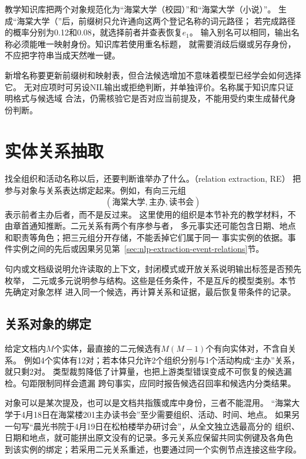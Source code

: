 教学知识库把两个对象规范化为“海棠大学（校园）”和“海棠大学（小说）”。
生成“海棠大学（”后，前缀树只允许通向这两个登记名称的词元路径；
若完成路径的概率分别为0.12和0.08，就选择前者并查表恢复$e_1$。
输入别名可以相同，输出名称必须能唯一映射身份。知识库若使用重名标题，
就需要消歧后缀或另存身份，不应把字符串当成天然唯一键。

新增名称要更新前缀树和映射表，但合法候选增加不意味着模型已经学会如何选择它。
无对应项时可另设NIL输出或拒绝判断，并单独评价。名称属于知识库只证明格式与候选域
合法，仍需核验它是否对应当前提及，不能用受约束生成替代身份判断。

\section{实体关系抽取}
\label{sec:nlp-extraction-relations}

找全组织和活动名称以后，还要判断谁举办了什么。（relation extraction, RE）
把参与对象与关系表达绑定起来。例如，有向三元组
\[
  (\text{海棠大学},\text{主办},\text{读书会})
\]
表示前者主办后者，而不是反过来。
这里使用的组织是本节补充的教学材料，不由章首通知推断。二元关系有两个有序参与者，
多元事实还可能包含日期、地点和职责等角色；把三元组分开存储，不能丢掉它们属于同一
事实实例的依据。事件实例之间的先后或因果另见第~\ref{sec:nlp-extraction-event-relations}节。

句内或文档级说明允许读取的上下文，封闭模式或开放关系说明输出标签是否预先枚举，
二元或多元说明参与结构。这些是任务条件，不是互斥的模型类别。本节先确定对象怎样
进入同一个候选，再计算关系和证据，最后恢复带条件的记录。

\subsection{关系对象的绑定}
\label{sec:nlp-extraction-relation-binding}

给定文档内$M$个实体，最直接的二元候选有$M(M-1)$个有向实体对，不含自关系。
例如4个实体有12对；若本体只允许2个组织分别与1个活动构成“主办”关系，就只剩2对。
类型裁剪降低了计算量，也把上游类型错误变成不可恢复的候选漏检。句距限制同样会遗漏
跨句事实，应同时报告候选召回率和候选内分类结果。

对象可以是某次提及，也可以是文档共指簇或库中身份，三者不能混用。
“海棠大学于4月18日在海棠楼201主办读书会”至少需要组织、活动、时间、地点。
如果另一句写“晨光书院于4月19日在松柏楼举办研讨会”，从全文独立选最高分的
组织、日期和地点，就可能拼出原文没有的记录。多元关系应保留共同实例键及各角色
到该实例的绑定；若采用二元关系重述，也要通过同一个实例节点连接这些字段。

